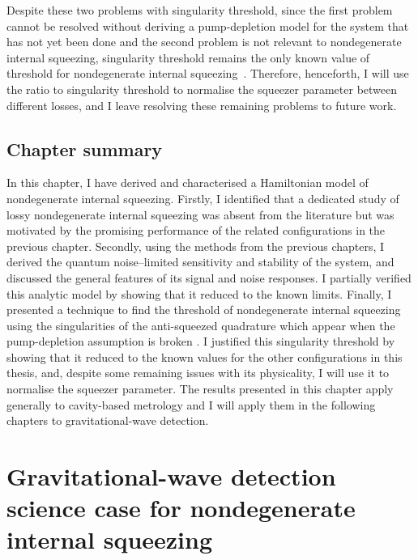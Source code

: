 Despite these two problems with singularity threshold, since the first problem cannot be resolved without deriving a pump-depletion model for the system that has not yet been done  and the second problem is not relevant to nondegenerate internal squeezing, singularity threshold remains the only known value of threshold for nondegenerate internal squeezing~\cite{}. Therefore, henceforth, I will use the ratio to singularity threshold to normalise the squeezer parameter between different losses, and I leave resolving these remaining problems to future work. 


\section{Chapter summary}

In this chapter, I have derived and characterised a Hamiltonian model of nondegenerate internal squeezing. Firstly, I identified that a dedicated study of lossy nondegenerate internal squeezing was absent from the literature but was motivated by the promising performance of the related configurations in the previous chapter. Secondly, using the methods from the previous chapters, I derived the quantum noise--limited sensitivity and stability of the system, and discussed the general features of its signal and noise responses. I partially verified this analytic model by showing that it reduced to the known limits. Finally, I presented a  technique to find the threshold of nondegenerate internal squeezing using the singularities of the anti-squeezed quadrature which appear when the pump-depletion assumption is broken . I justified this singularity threshold by showing that it reduced to the known values for the other configurations in this thesis, and, despite some remaining issues with its physicality, I will use it to normalise the squeezer parameter. 
The results presented in this chapter apply generally to cavity-based metrology and I will apply them in the following chapters to gravitational-wave detection.




\chapter{Gravitational-wave detection science case for nondegenerate internal squeezing}
\label{chp:science_case}

